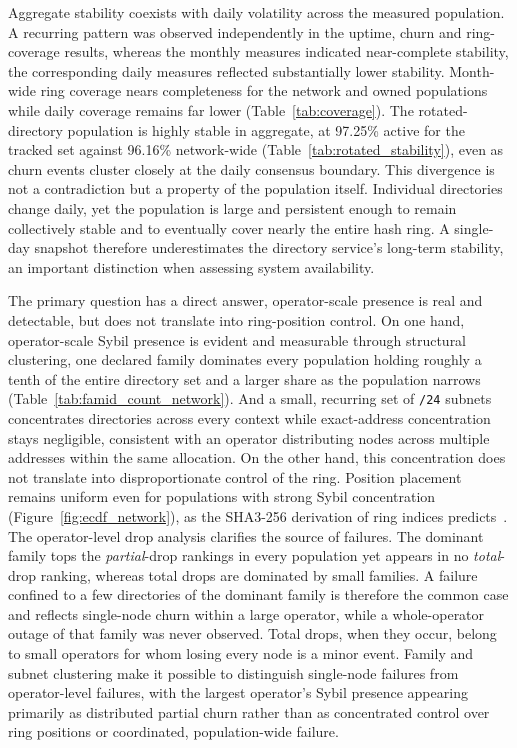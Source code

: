 \documentclass[conference]{IEEEtran}
\begin{document}
Aggregate stability coexists with daily volatility across the measured population. A recurring pattern was observed independently in the uptime, churn and ring-coverage 
results, whereas the monthly measures indicated near-complete stability, the corresponding daily measures reflected substantially lower stability. Month-wide ring coverage 
nears completeness for the network and owned populations while daily coverage remains far lower (Table~\ref{tab:coverage}). The rotated-directory population is highly 
stable in aggregate, at 97.25\% active for the tracked set against 96.16\% network-wide (Table~\ref{tab:rotated_stability}), even as churn events cluster closely at 
the daily consensus boundary. This divergence is not a contradiction but a property of the population itself. Individual directories change daily, yet the population is 
large and persistent enough to remain collectively stable and to eventually cover nearly the entire hash ring. A single-day snapshot therefore underestimates the 
directory service’s long-term stability, an important distinction when assessing system availability.

The primary question has a direct answer, operator-scale presence is real and detectable, but does not translate into ring-position control. On one hand, 
operator-scale Sybil presence is evident and measurable through structural clustering, one declared family dominates every population holding roughly a tenth 
of the entire directory set and a larger share as the population narrows (Table~\ref{tab:famid_count_network}). And a small, 
recurring set of \texttt{/24} subnets concentrates directories across every context while exact-address concentration stays negligible, consistent with an operator 
distributing nodes across multiple addresses within the same allocation. On the other hand, this concentration does not translate into disproportionate control of 
the ring. Position placement remains uniform even for populations with strong Sybil concentration (Figure~\ref{fig:ecdf_network}), as the SHA3-256 derivation of ring 
indices predicts~\cite{tor_rendspec, tor_dirspec}. The operator-level drop analysis clarifies the source of failures. The dominant family tops the \emph{partial}-drop 
rankings in every population yet appears in no \emph{total}-drop ranking, whereas total drops are dominated by small families. A failure confined to a few directories 
of the dominant family is therefore the common case and reflects single-node churn within a large operator, while a whole-operator outage of that family was never 
observed. Total drops, when they occur, belong to small operators for whom losing every node is a minor event. Family and subnet clustering make it possible to distinguish 
single-node failures from operator-level failures, with the largest operator’s Sybil presence appearing primarily as distributed partial churn rather than as concentrated 
control over ring positions or coordinated, population-wide failure.
\end{document}
